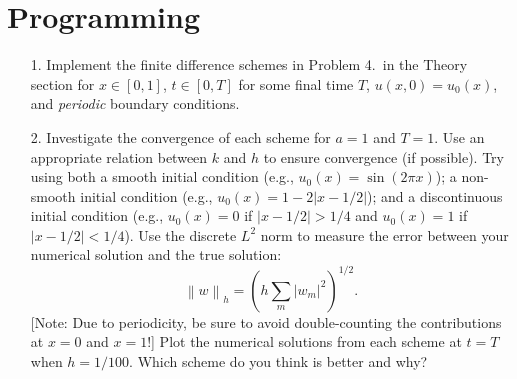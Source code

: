 \documentclass{article}
\providecommand{\abs}[1]{\left\lvert#1\right\rvert}
\providecommand{\norm}[1]{\left\lVert#1\right\rVert}
\begin{document}
\section{Programming}

\begin{itemize}
\item[1.] Implement the finite difference schemes in Problem 4.\ in the Theory section for $x \in [0,1]$, $t \in [0,T]$ for some final time $T$, $u(x,0) = u_0(x)$, and \emph{periodic} boundary conditions.
\item[2.] Investigate the convergence of each scheme for $a = 1$ and $T = 1$. Use an appropriate relation between $k$ and $h$ to ensure convergence (if possible). Try using both a smooth initial condition (e.g., $u_0(x) = \sin(2 \pi x)$); a non-smooth initial condition (e.g., $u_0(x) = 1 - 2 \abs{x - 1/2}$); and a discontinuous initial condition (e.g., $u_0(x) = 0$ if $\abs{x - 1/2} > 1/4$ and $u_0(x) = 1$ if $\abs{x - 1/2} < 1/4$). Use the discrete $L^2$ norm to measure the error between your numerical solution and the true solution:
\begin{equation*}
\norm{w}_h = \left( h \sum_m \abs{w_m}^2 \right)^{1/2}.
\end{equation*}
[Note: Due to periodicity, be sure to avoid double-counting the contributions at $x = 0$ and $x = 1$!] Plot the numerical solutions from each scheme at $t = T$ when $h = 1/100$. Which scheme do you think is better and why?
\end{itemize}
\end{document}
